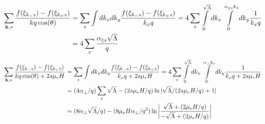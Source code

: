 \documentclass{article}
\begin{document}
\begin{align}
\sum\limits_{{\bf k},s}\frac{f(\xi_{k_-s})-f(\xi_{k_+s})}{kq\cos(\theta)} &= \sum\limits_{s}\int dk_x dk_y \frac{f(\xi_{k_-s})-f(\xi_{k_+s})}{k_xq}=4 \sum\limits_{s} \int\limits_0^{\sqrt{\Lambda}} dk_x \int\limits_0^{\alpha_{\parallel s} k_x} dk_y \frac{1}{k_xq}\\
&=4 \sum\limits_{s}  \frac{\alpha_{\parallel s} \sqrt{\Lambda}}{q}
\end{align}
\begin{align}
\sum\limits_{{\bf k},s}\frac{f(\xi_{k_-s})-f(\xi_{k_+\bar{s}})}{kq\cos(\theta)+2s\mu_e H} &= \sum\limits_{s}\int dk_x dk_y \frac{f(\xi_{k_-s})-f(\xi_{k_+\bar{s}})}{k_x q+2s\mu_e H}= 4\sum\limits_{s}\int\limits_0^{\sqrt{\Lambda}} dk_x \int\limits_0^{\alpha_\perp k_x}dk_y \frac{1}{k_x q+2s\mu_e H} \\
&=(4\alpha_{\perp}/q) \sum\limits_{s} \sqrt{\Lambda}-(2s\mu_e H/q) \ln |\sqrt{\Lambda}/(2s\mu_e H/q)+1|  \\
&=(8\alpha_{\perp}\sqrt{\Lambda}/q) -(8\mu_e H \alpha_\perp /q^2) \ln\bigg| \frac{\sqrt{\Lambda}+(2\mu_e H/q)}{-\sqrt{\Lambda}+(2\mu_e H/q)}\bigg| 
\end{align}
\end{document}

